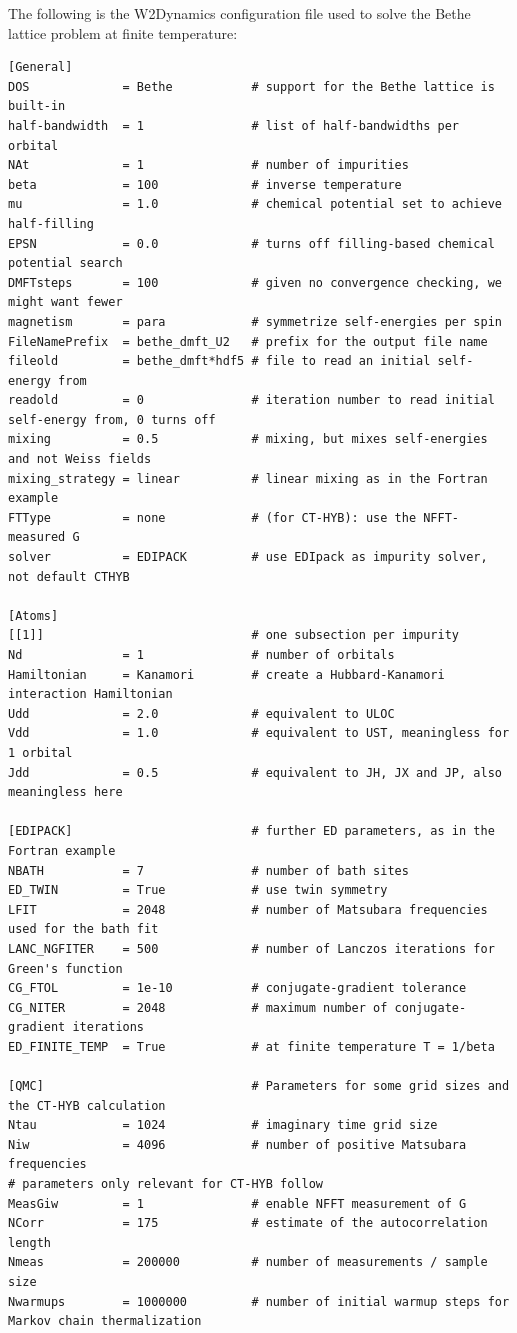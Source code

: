 \documentclass[edipack_sp.tex]{subfiles}
\begin{document}
The following is the W2Dynamics configuration file used to solve the Bethe lattice problem at finite temperature: 
\begin{lstlisting}[style=mybash,language={},numbers=none,basicstyle={\scriptsize\ttfamily}]
[General]
DOS             = Bethe           # support for the Bethe lattice is built-in
half-bandwidth  = 1               # list of half-bandwidths per orbital
NAt             = 1               # number of impurities
beta            = 100             # inverse temperature
mu              = 1.0             # chemical potential set to achieve half-filling
EPSN            = 0.0             # turns off filling-based chemical potential search
DMFTsteps       = 100             # given no convergence checking, we might want fewer
magnetism       = para            # symmetrize self-energies per spin
FileNamePrefix  = bethe_dmft_U2   # prefix for the output file name
fileold         = bethe_dmft*hdf5 # file to read an initial self-energy from
readold         = 0               # iteration number to read initial self-energy from, 0 turns off
mixing          = 0.5             # mixing, but mixes self-energies and not Weiss fields
mixing_strategy = linear          # linear mixing as in the Fortran example
FTType          = none            # (for CT-HYB): use the NFFT-measured G
solver          = EDIPACK         # use EDIpack as impurity solver, not default CTHYB

[Atoms]
[[1]]                             # one subsection per impurity
Nd              = 1               # number of orbitals
Hamiltonian     = Kanamori        # create a Hubbard-Kanamori interaction Hamiltonian
Udd             = 2.0             # equivalent to ULOC
Vdd             = 1.0             # equivalent to UST, meaningless for 1 orbital
Jdd             = 0.5             # equivalent to JH, JX and JP, also meaningless here

[EDIPACK]                         # further ED parameters, as in the Fortran example
NBATH           = 7               # number of bath sites
ED_TWIN         = True            # use twin symmetry
LFIT            = 2048            # number of Matsubara frequencies used for the bath fit
LANC_NGFITER    = 500             # number of Lanczos iterations for Green's function
CG_FTOL         = 1e-10           # conjugate-gradient tolerance
CG_NITER        = 2048            # maximum number of conjugate-gradient iterations
ED_FINITE_TEMP  = True            # at finite temperature T = 1/beta

[QMC]                             # Parameters for some grid sizes and the CT-HYB calculation
Ntau            = 1024            # imaginary time grid size
Niw             = 4096            # number of positive Matsubara frequencies
# parameters only relevant for CT-HYB follow
MeasGiw         = 1               # enable NFFT measurement of G
NCorr           = 175             # estimate of the autocorrelation length
Nmeas           = 200000          # number of measurements / sample size
Nwarmups        = 1000000         # number of initial warmup steps for Markov chain thermalization
\end{lstlisting}
\end{document}
